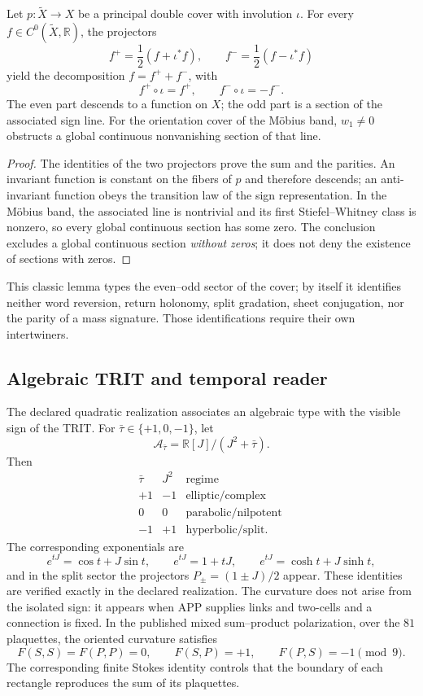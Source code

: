 \begin{theorem}
\label{pf84:A10-md-mobius}
Let \(p:\widetilde X\to X\) be a principal double cover with involution
\(\iota\). For every \(f\in C^0(\widetilde X,\mathbb R)\), the projectors
\[
 f^+=\frac12(f+\iota^*f),\qquad
 f^-=\frac12(f-\iota^*f)
\]
yield the decomposition \(f=f^++f^-\), with
\[
 f^+\circ\iota=f^+,\qquad f^-\circ\iota=-f^-.
\]
The even part descends to a function on \(X\); the odd part is a
section of the associated sign line. For the orientation cover
of the Möbius band, \(w_1\ne0\) obstructs a global continuous
nonvanishing section of that line.
\end{theorem}

\begin{proof}
The identities of the two projectors prove the sum and the parities. An invariant function is constant on the fibers of \(p\) and therefore descends; an anti-invariant function obeys the transition law of the sign representation. In the Möbius band, the associated line is nontrivial and its first Stiefel--Whitney class is nonzero, so every global continuous section has some zero. The conclusion excludes a global continuous section \emph{without zeros}; it does not deny the existence of sections with zeros.
\end{proof}

This classic lemma types the even--odd sector of the cover; by itself it identifies
neither word reversion, return holonomy, split
gradation, sheet conjugation, nor the parity of a
mass signature. Those identifications require their own intertwiners.

\subsection{Algebraic TRIT and temporal reader}

The declared quadratic realization associates an algebraic type with the visible sign of the TRIT. For
\(\bar\tau\in\{+1,0,-1\}\), let
\[
 \mathcal A_{\bar\tau}=
 \mathbb R[J]/(J^2+\bar\tau).
\]
Then
\[
 \begin{array}{c|c|c}
 \bar\tau&J^2&\text{regime}\ \\ \hline
 +1&-1&\text{elliptic/complex}\ \\
 0&0&\text{parabolic/nilpotent}\ \\
 -1&+1&\text{hyperbolic/split}.
 \end{array}
\]
The corresponding exponentials are
\[
 e^{tJ}=\cos t+J\sin t,
 \qquad e^{tJ}=1+tJ,
 \qquad e^{tJ}=\cosh t+J\sinh t,
\]
and in the split sector the projectors
\(P_\pm=(1\pm J)/2\) appear. These identities are verified exactly in the
declared realization. The
curvature does not arise from the isolated sign: it appears when APP supplies links and
two-cells and a connection is fixed. In the published mixed sum--product
polarization, over the \(81\) plaquettes, the oriented curvature satisfies
\[
 F(S,S)=F(P,P)=0,
 \qquad F(S,P)=+1,
 \qquad F(P,S)=-1\pmod9.
\]
The corresponding finite Stokes identity controls that the boundary of each
rectangle reproduces the sum of its plaquettes.

